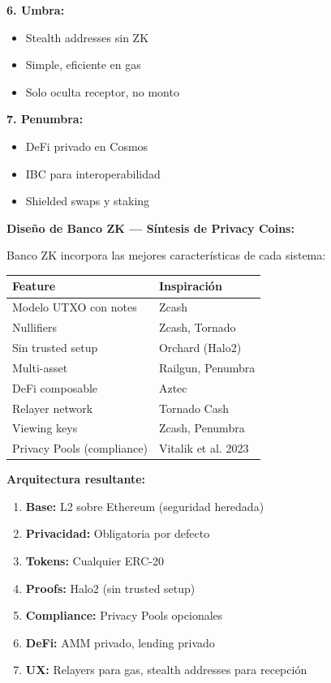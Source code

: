 \documentclass[11pt,a4paper,twoside]{book}
\begin{document}
\begin{keyidea}
\textbf{6. Umbra:}
\begin{itemize}
    \item Stealth addresses sin ZK
    \item Simple, eficiente en gas
    \item Solo oculta receptor, no monto
\end{itemize}

\textbf{7. Penumbra:}
\begin{itemize}
    \item DeFi privado en Cosmos
    \item IBC para interoperabilidad
    \item Shielded swaps y staking
\end{itemize}
\end{keyidea}

\begin{bancozk}
\textbf{Dise\~no de Banco ZK --- S\'intesis de Privacy Coins:}

Banco ZK incorpora las mejores caracter\'isticas de cada sistema:

\begin{center}
\begin{tabular}{ll}
\toprule
\textbf{Feature} & \textbf{Inspiraci\'on} \\
\midrule
Modelo UTXO con notes & Zcash \\
Nullifiers & Zcash, Tornado \\
Sin trusted setup & Orchard (Halo2) \\
Multi-asset & Railgun, Penumbra \\
DeFi composable & Aztec \\
Relayer network & Tornado Cash \\
Viewing keys & Zcash, Penumbra \\
Privacy Pools (compliance) & Vitalik et al. 2023 \\
\bottomrule
\end{tabular}
\end{center}

\textbf{Arquitectura resultante:}
\begin{enumerate}
    \item \textbf{Base:} L2 sobre Ethereum (seguridad heredada)
    \item \textbf{Privacidad:} Obligatoria por defecto
    \item \textbf{Tokens:} Cualquier ERC-20
    \item \textbf{Proofs:} Halo2 (sin trusted setup)
    \item \textbf{Compliance:} Privacy Pools opcionales
    \item \textbf{DeFi:} AMM privado, lending privado
    \item \textbf{UX:} Relayers para gas, stealth addresses para recepci\'on
\end{enumerate}
\end{bancozk}
\end{document}
